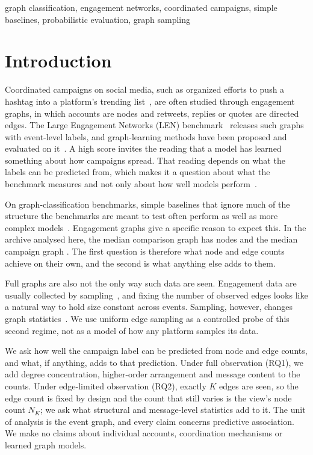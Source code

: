 \documentclass[conference]{IEEEtran}
\newcommand{\NK}{N_K}
\begin{document}
\begin{IEEEkeywords}
graph classification, engagement networks, coordinated campaigns, simple baselines, probabilistic evaluation, graph sampling
\end{IEEEkeywords}

\section{Introduction}
Coordinated campaigns on social media, such as organized efforts to push a hashtag into a platform's trending list~\cite{elmas}, are often studied through engagement graphs, in which accounts are nodes and retweets, replies or quotes are directed edges. The Large Engagement Networks (LEN) benchmark~\cite{len} releases such graphs with event-level labels, and graph-learning methods have been proposed and evaluated on it~\cite{decode}. A high score invites the reading that a model has learned something about how campaigns spread. That reading depends on what the labels can be predicted from, which makes it a question about what the benchmark measures and not only about how well models perform~\cite{jacobs}.

On graph-classification benchmarks, simple baselines that ignore much of the structure the benchmarks are meant to test often perform as well as more complex models~\cite{li,errica,coupette}. Engagement graphs give a specific reason to expect this. In the archive analysed here, the median comparison graph has \RNodesMedComp{} nodes and the median campaign graph \RNodesMedCamp. The first question is therefore what node and edge counts achieve on their own, and the second is what anything else adds to them.

Full graphs are also not the only way such data are seen. Engagement data are usually collected by sampling~\cite{morstatter}, and fixing the number of observed edges looks like a natural way to hold size constant across events. Sampling, however, changes graph statistics~\cite{leskovec}. We use uniform edge sampling as a controlled probe of this second regime, not as a model of how any platform samples its data.

We ask how well the campaign label can be predicted from node and edge counts, and what, if anything, adds to that prediction. Under full observation (RQ1), we add degree concentration, higher-order arrangement and message content to the counts. Under edge-limited observation (RQ2), exactly $K$ edges are seen, so the edge count is fixed by design and the count that still varies is the view's node count $\NK$; we ask what structural and message-level statistics add to it. The unit of analysis is the event graph, and every claim concerns predictive association. We make no claims about individual accounts, coordination mechanisms or learned graph models.
\end{document}
